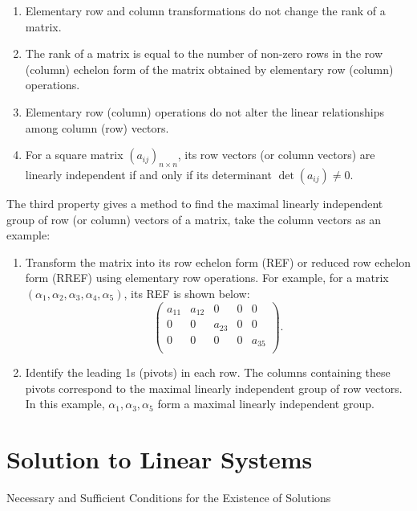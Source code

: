 \documentclass[11pt]{../../TexTemplate/elegantbook} %
\begin{document}
\begin{property}
    \begin{enumerate}
        \item Elementary row and column transformations do not change the rank of a matrix.
        \item The rank of a matrix is equal to the number of non-zero rows in the row (column) echelon form of the matrix 
            obtained by elementary row (column) operations.
        \item Elementary row (column) operations do not alter the linear relationships among column (row) vectors.
        \item For a square matrix \(\left( a_{ij} \right)_{n\times n} \), its row vectors (or column vectors) are 
            linearly independent if and only if its determinant \( \det(a_{ij}) \neq 0 \).
    \end{enumerate}
\end{property}
The third property gives a method to find the maximal linearly independent group of row (or column) vectors of a matrix,
take the column vectors as an example:
\begin{enumerate}
    \item Transform the matrix into its row echelon form (REF) or reduced row echelon form (RREF) using elementary row operations.
        For example, for a matrix \( \left( \alpha_{1}, \alpha_{2}, \alpha_{3}, \alpha_{4}, \alpha_{5} \right) \),
        its REF is shown below:
        \[
        \begin{pmatrix}
        a_{11} & a_{12} & 0 & 0 & 0 \\
        0 & 0 & a_{23} & 0 & 0 \\
        0 & 0 & 0 & 0 & a_{35} \\
        \end{pmatrix}.
        \]
    \item Identify the leading 1s (pivots) in each row. The columns containing these pivots correspond to the maximal linearly independent group of row vectors.
        In this example, \(\alpha_{1}, \alpha_{3}, \alpha_{5}\) form a maximal linearly independent group.
\end{enumerate}


\section{Solution to Linear Systems}
\begin{leftbarTitle}{Necessary and Sufficient Conditions for the Existence of Solutions}\end{leftbarTitle}
\end{document}
